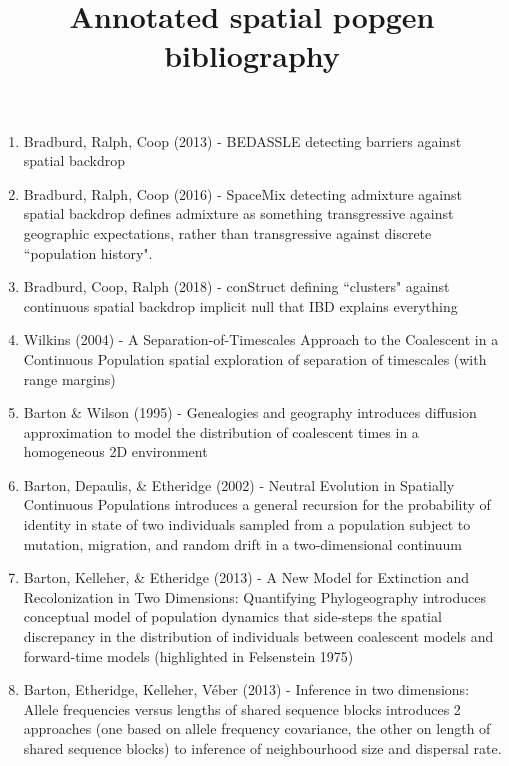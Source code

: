 \documentclass[12pt]{article}
\title{Annotated spatial popgen bibliography}
\begin{document}
\maketitle
\newpage

\begin{enumerate}
\item Bradburd, Ralph, Coop (2013) - BEDASSLE
\subitem detecting barriers against spatial backdrop

\item Bradburd, Ralph, Coop (2016) - SpaceMix
\subitem detecting admixture against spatial backdrop
\subitem defines admixture as something transgressive against geographic expectations,
 rather than transgressive against discrete ``population history".

\item Bradburd, Coop, Ralph (2018) - conStruct
\subitem defining ``clusters" against continuous spatial backdrop
\subitem implicit null that IBD explains everything
 
\item Wilkins (2004) - A Separation-of-Timescales Approach to the Coalescent in a Continuous Population
\subitem spatial exploration of separation of timescales (with range margins)

\item Barton \& Wilson (1995) - Genealogies and geography
\subitem introduces diffusion approximation to model the distribution of coalescent times 
in a homogeneous 2D environment

\item Barton, Depaulis, \& Etheridge (2002) - Neutral Evolution in Spatially Continuous Populations
\subitem introduces a general recursion for the probability of identity in state of two individuals 
sampled from a population subject to mutation, migration, and random drift in a two-dimensional continuum

\item Barton, Kelleher, \& Etheridge (2013) - A New Model for Extinction and Recolonization in Two Dimensions: Quantifying Phylogeography
\subitem introduces conceptual model of population dynamics that side-steps 
the spatial discrepancy in the distribution of individuals between coalescent models 
and forward-time models (highlighted in Felsenstein 1975)

\item Barton, Etheridge, Kelleher, V\'{e}ber (2013) - Inference in two dimensions: Allele frequencies versus lengths of shared sequence blocks
\subitem introduces 2 approaches (one based on allele frequency covariance, 
the other on length of shared sequence blocks) 
to inference of neighbourhood size and dispersal rate.


\end{enumerate}
\end{document}
